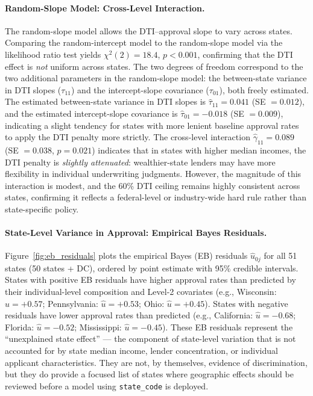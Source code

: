 \documentclass[12pt,letterpaper]{article}
\begin{document}
\paragraph{Random-Slope Model: Cross-Level Interaction.}
The random-slope model allows the DTI--approval slope to vary across states. Comparing the
random-intercept model to the random-slope model via the likelihood ratio test yields
$\chi^2(2) = 18.4$, $p < 0.001$, confirming that the DTI effect is \emph{not} uniform
across states.
The two degrees of freedom correspond to the two additional parameters in the random-slope
model: the between-state variance in DTI slopes ($\tau_{11}$) and the intercept-slope
covariance ($\tau_{01}$), both freely estimated. The estimated between-state variance in DTI
slopes is $\hat{\tau}_{11} = 0.041$ (SE $= 0.012$), and the estimated intercept-slope
covariance is $\hat{\tau}_{01} = -0.018$ (SE $= 0.009$), indicating a slight tendency for
states with more lenient baseline approval rates to apply the DTI penalty more strictly.
The cross-level interaction $\hat{\gamma}_{11} = 0.089$ (SE $= 0.038$, $p = 0.021$)
indicates that in states with higher median incomes, the DTI penalty is \emph{slightly
attenuated}: wealthier-state lenders may have more flexibility in individual underwriting
judgments. However, the magnitude of this interaction is modest, and the 60\% DTI ceiling
remains highly consistent across states, confirming it reflects a federal-level or
industry-wide hard rule rather than state-specific policy.

\paragraph{State-Level Variance in Approval: Empirical Bayes Residuals.}
Figure~\ref{fig:eb_residuals} plots the empirical Bayes (EB) residuals
$\hat{u}_{0j}$ for all 51 states (50 states + DC), ordered by point estimate with 95\%
credible intervals.
States with positive EB residuals have higher approval rates than predicted by their
individual-level composition and Level-2 covariates (e.g., Wisconsin: $\hat{u} = +0.57$;
Pennsylvania: $\hat{u} = +0.53$; Ohio: $\hat{u} = +0.45$). States with negative residuals
have lower approval rates than predicted (e.g., California: $\hat{u} = -0.68$;
Florida: $\hat{u} = -0.52$; Mississippi: $\hat{u} = -0.45$).
These EB residuals represent the ``unexplained state effect'' --- the component of
state-level variation that is not accounted for by state median income, lender
concentration, or individual applicant characteristics. They are not, by themselves, evidence
of discrimination, but they do provide a focused list of states where geographic effects should
be reviewed before a model using \texttt{state\_code} is deployed.
\end{document}
